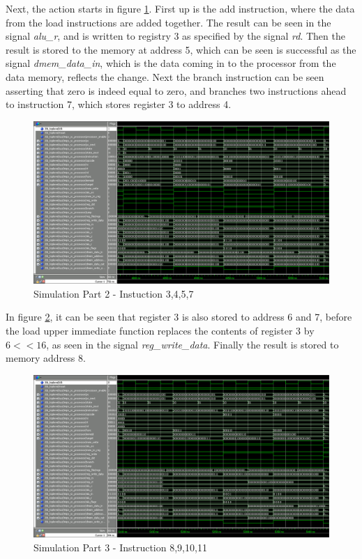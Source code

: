 Next, the action starts in figure \ref{fig:sim2}. First up is the add instruction, where the data from the load instructions are added together. The result can be seen in the signal \emph{alu_r}, and is written to registry 3 as specified by the signal \emph{rd}. Then the result is stored to the memory at address 5, which can be seen is successful as the signal \emph{dmem_data_in}, which is the data coming in to the processor from the data memory, reflects the change. Next the branch instruction can be seen asserting that zero is indeed equal to zero, and branches two instructions ahead to instruction 7, which stores register 3 to address 4.

\begin{figure}[ht]
    \centering
    \includegraphics[scale=0.3]{figures/sim2.png}
    \caption{\label{fig:sim2}Simulation Part 2 - Instuction 3,4,5,7}
\end{figure}

In figure \ref{fig:sim3}, it can be seen that register 3 is also stored to address 6 and 7, before the load upper immediate function replaces the contents of register 3 by $6 << 16$, as seen in the signal \emph{reg_write_data}. Finally the result is stored to memory address 8.

\begin{figure}[ht]
    \centering
    \includegraphics[scale=0.3]{figures/sim3.png}
    \caption{\label{fig:sim3}Simulation Part 3 - Instruction 8,9,10,11}
\end{figure}

